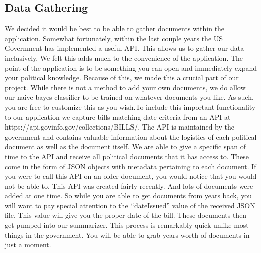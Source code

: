 \documentclass[11pt,a4paper]{article}
\begin{document}
\subsection{Data Gathering}
 We decided it would be best to be able to gather documents within the application. Somewhat fortunately, within the last couple years the US Government has implemented a useful API. This allows us to gather our data inclusively. We felt this adds much to the convenience of the application. The point of the application is to be something you can open and immediately expand your political knowledge. 
 \newline\indent Because of this, we made this a crucial part of our project. While there is not a method to add your own documents, we do allow our naive bayes classifier to be trained on whatever documents you like. As such, you are free to customize this as you wish.To include this important functionality to our application we capture bills matching date criteria from an API at https://api.govinfo.gov/collections/BILLS/. The API is maintained by the government and contains valuable information about the logistics of each political document as well as the document itself. We are able to give a specific span of time to the API and receive all political documents that it has access to. These come in the form of JSON objects with metadata pertaining to each document. If you were to call this API on an older document, you would notice that you would not be able to. This API was created fairly recently. And lots of documents were added at one time. So while you are able to get documents from years back, you will want to pay special attention to the “dateIssued” value of the received JSON file. This value will give you the proper date of the bill. These documents then get pumped into our summarizer. This process is remarkably quick unlike most things in the government. You will be able to grab years worth of documents in just a moment.
\end{document}
